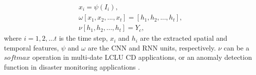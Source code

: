 \begin{equation}
    \begin{aligned}
    & x_i = \psi (I_i),\\
    & \omega [x_1, x_2, ..., x_t] = [h_1, h_2, ..., h_t],\\
    & \nu [h_1, h_2, ..., h_t] = Y_c,
\end{aligned}
\end{equation}
where $i=1,2,...t$ is the time step, $x_i$ and $h_i$ are the extracted spatial and temporal features, $\psi$ and $\omega$ are the CNN and RNN units, respectively. $\nu$ can be a $softmax$ operation in multi-date LCLU CD applications\cite{sefrin2020deep}, or an anomaly detection function in disaster monitoring applications \cite{saha2022change}.





